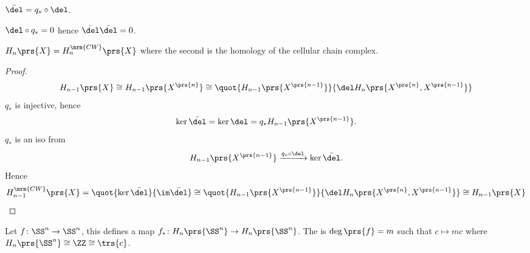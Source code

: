 \documentclass[10pt,a4paper,twoside,openany,hidelinks]{book}
\begin{document}
\begin{definition}
$\bar{\del} = q_* \circ \del$.
\end{definition}
\begin{remark}
$\del \circ q_* = 0$ hence $\bar{\del} \bar{\del} = 0$.
\end{remark}
\begin{proposition}
$H_n\prs{X} = H_n^{\mrm{CW}}\prs{X}$ where the second is the homology of the cellular chain complex.
\end{proposition}
\begin{proof}
\[H_{n-1}\prs{X} \cong H_{n-1}\prs{X^{\prs{n}}} \cong \quot{H_{n-1}\prs{X^{\prs{n-1}}}}{\del H_n \prs{X^{\prs{n}}, X^{\prs{n-1}}}}\]
$q_*$ is injective, hence \[\ker \bar{\del} = \ker \del = q_* H_{n-1}\prs{X^{\prs{n-1}}} \text{.}\]
$q_*$ is an iso from \[H_{n-1}\prs{X^{\prs{n-1}}} \xrightarrow{q_* \circ \del} \ker \bar{\del}\text{.}\]
Hence
\[H_{n-1}^{\mrm{CW}}\prs{X} = \quot{\ker \bar{\del}}{\im \bar{\del}} \cong \quot{H_{n-1}\prs{X^{\prs{n-1}}}}{\del H_n\prs{X^{\prs{n}}, X^{\prs{n-1}}}} \cong H_{n-1}\prs{X}\]
\end{proof}
\begin{definition}
Let $f \colon \SS^n \to \SS^n$, this defines a map $f_* \colon H_n\prs{\SS^n} \to H_n\prs{\SS^n}$. The  is $\deg \prs{f} = m$ such that $c \mapsto mc$ where $H_n \prs{\SS^n} \cong \ZZ \cong \trs{c}$.
\end{definition}
\end{document}
